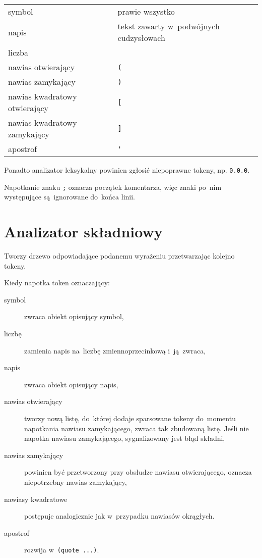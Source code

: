 \documentclass[a4paper,11pt]{article}
\begin{document}
\begin{table}[H]
  \centering
  \begin{tabular}{|p{6cm} p{6cm}|} \hline
    symbol & prawie wszystko \\
    napis & tekst zawarty w~podwójnych cudzysłowach \\ 
    liczba & \\ \hline
    nawias otwierający & \verb+(+ \\
    nawias zamykający & \verb+)+ \\ \hline
    nawias kwadratowy otwierający & \verb+[+ \\
    nawias kwadratowy zamykający & \verb+]+ \\ \hline
    apostrof & \verb+'+ \\ \hline
  \end{tabular}
\end{table}

Ponadto analizator leksykalny powinien zgłosić niepoprawne tokeny, np.
\verb+0.0.0+.

Napotkanie znaku \verb+;+ oznacza początek komentarza, więc znaki po~nim
występujące są~ignorowane do~końca linii.

\section{Analizator składniowy}

Tworzy drzewo odpowiadające podanemu wyrażeniu przetwarzając kolejno tokeny.

Kiedy napotka token oznaczający:
\begin{description}
\item[symbol] zwraca obiekt opisujący symbol,
\item[liczbę] zamienia napis na~liczbę zmiennoprzecinkową i~ją~zwraca,
\item[napis] zwraca obiekt opisujący napis,
\item[nawias otwierający] tworzy nową listę, do~której dodaje sparsowane tokeny
  do~momentu napotkania nawiasu zamykającego, zwraca tak zbudowaną listę. Jeśli
  nie napotka nawiasu zamykającego, sygnalizowany jest błąd składni,
\item[nawias zamykający] powinien być przetworzony przy obsłudze nawiasu
  otwierającego, oznacza niepotrzebny nawias zamykający,
\item[nawiasy kwadratowe] postępuje analogicznie jak w~przypadku nawiasów
  okrągłych.
\item[apostrof] rozwija w~\verb+(quote ...)+.
\end{description}
\end{document}
